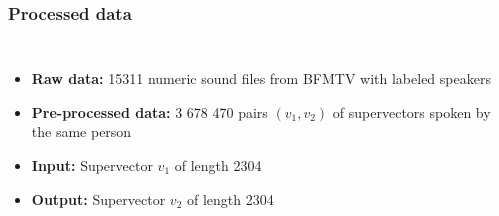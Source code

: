 \documentclass[11pt,english]{beamer}
\begin{document}
\begin{frame}
  \frametitle{Processed data}

  \begin{columns}
    \begin{itemize}
\setlength\itemsep{2em}
    \item \textbf{Raw data:} 15311 numeric sound files from BFMTV with labeled speakers
    \item \textbf{Pre-processed data:} 3 678 470 pairs $(v_1,v_2)$ of supervectors
      spoken by the same person
    \item \textbf{Input:} Supervector $v_1$ of length 2304
    \item \textbf{Output:} Supervector $v_2$ of length 2304

    \end{itemize}

  \end{columns}

\end{frame}
\end{document}
